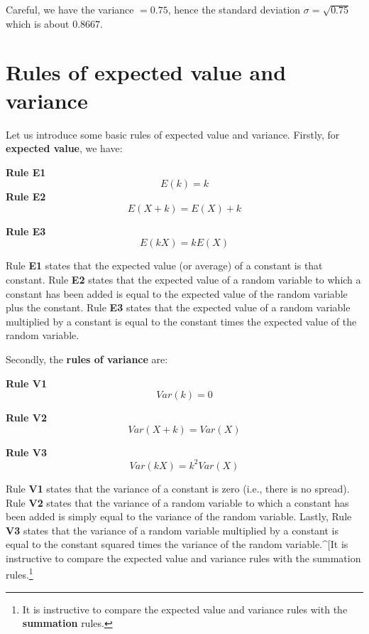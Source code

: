 \documentclass[
  letterpaper,
  DIV=11,
  numbers=noendperiod]{scrreprt}
\begin{document}
Careful, we have the variance \(=0.75\), hence the standard deviation
\(\sigma = \sqrt{0.75}\) which is about \(0.8667\).

\section{Rules of expected value and
variance}\label{rules-of-expected-value-and-variance}

Let us introduce some basic rules of expected value and variance.
Firstly, for \textbf{expected value}, we have:

\textbf{Rule E1} \[E(k)=k\] \textbf{Rule E2} \[E(X+k)=E(X)+k\]

\textbf{Rule E3} \[E(kX)=kE(X)\]

Rule \textbf{E1} states that the expected value (or average) of a
constant is that constant. Rule \textbf{E2} states that the expected
value of a random variable to which a constant has been added is equal
to the expected value of the random variable plus the constant. Rule
\textbf{E3} states that the expected value of a random variable
multiplied by a constant is equal to the constant times the expected
value of the random variable.

Secondly, the \textbf{rules of variance} are:

\textbf{Rule V1} \[Var(k)=0\]

\textbf{Rule V2} \[Var(X+k)=Var(X)\]

\textbf{Rule V3} \[Var(kX)=k^2 Var(X)\]

Rule \textbf{V1} states that the variance of a constant is zero (i.e.,
there is no spread). Rule \textbf{V2} states that the variance of a
random variable to which a constant has been added is simply equal to
the variance of the random variable. Lastly, Rule \textbf{V3} states
that the variance of a random variable multiplied by a constant is equal
to the constant squared times the variance of the random
variable.\^{}{[}It is instructive to compare the expected value and
variance rules with the summation rules.\footnote{It is instructive to
  compare the expected value and variance rules with the
  \textbf{summation} rules.}
\end{document}
